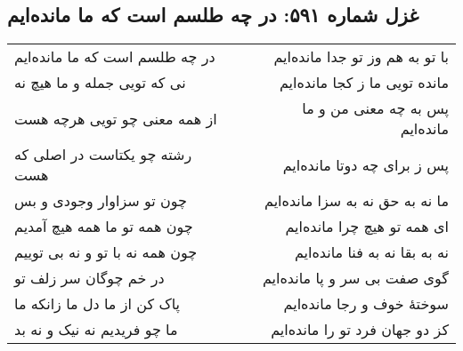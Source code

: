 \begin{center}
\section*{غزل شماره ۵۹۱: در چه طلسم است که ما مانده‌ایم}
\label{sec:591}
\begin{longtable}{l p{0.5cm} r}
در چه طلسم است که ما مانده‌ایم
&&
با تو به هم وز تو جدا مانده‌ایم
\\
نی که تویی جمله و ما هیچ نه
&&
مانده تویی ما ز کجا مانده‌ایم
\\
از همه معنی چو تویی هرچه هست
&&
پس به چه معنی من و ما مانده‌ایم
\\
رشته چو یکتاست در اصلی که هست
&&
پس ز برای چه دوتا مانده‌ایم
\\
چون تو سزاوار وجودی و بس
&&
ما نه به حق نه به سزا مانده‌ایم
\\
چون همه تو ما همه هیچ آمدیم
&&
ای همه تو هیچ چرا مانده‌ایم
\\
چون همه نه با تو و نه بی توییم
&&
نه به بقا نه به فنا مانده‌ایم
\\
در خم چوگان سر زلف تو
&&
گوی صفت بی سر و پا مانده‌ایم
\\
پاک کن از ما دل ما زانکه ما
&&
سوختهٔ خوف و رجا مانده‌ایم
\\
ما چو فریدیم نه نیک و نه بد
&&
کز دو جهان فرد تو را مانده‌ایم
\\
\end{longtable}
\end{center}
